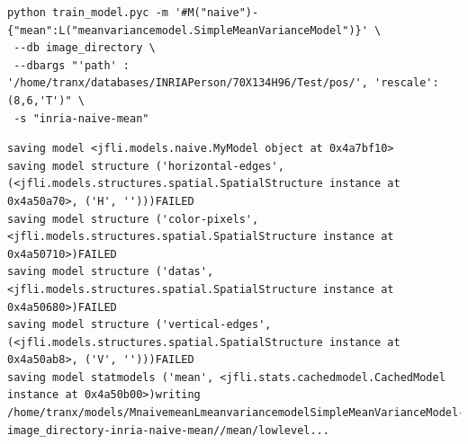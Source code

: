 \documentclass{report}
\begin{document}
\begin{lstlisting}
python train_model.pyc -m '#M("naive")-{"mean":L("meanvariancemodel.SimpleMeanVarianceModel")}' \
 --db image_directory \
 --dbargs "'path' : '/home/tranx/databases/INRIAPerson/70X134H96/Test/pos/', 'rescale':(8,6,'T')" \
 -s "inria-naive-mean"

\end{lstlisting}







\begin{verbatim}
saving model <jfli.models.naive.MyModel object at 0x4a7bf10>
saving model structure ('horizontal-edges', (<jfli.models.structures.spatial.SpatialStructure instance at 0x4a50a70>, ('H', '')))FAILED
saving model structure ('color-pixels', <jfli.models.structures.spatial.SpatialStructure instance at 0x4a50710>)FAILED
saving model structure ('datas', <jfli.models.structures.spatial.SpatialStructure instance at 0x4a50680>)FAILED
saving model structure ('vertical-edges', (<jfli.models.structures.spatial.SpatialStructure instance at 0x4a50ab8>, ('V', '')))FAILED
saving model statmodels ('mean', <jfli.stats.cachedmodel.CachedModel instance at 0x4a50b00>)writing /home/tranx/models/MnaivemeanLmeanvariancemodelSimpleMeanVarianceModel-image_directory-inria-naive-mean//mean/lowlevel...

\end{verbatim}
\end{document}
